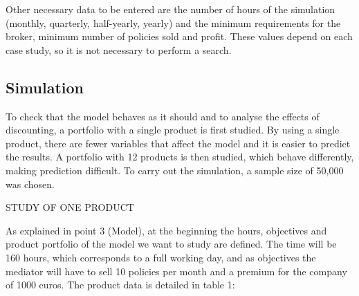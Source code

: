 \documentclass[review]{elsarticle}
\begin{document}
Other necessary data to be entered are the number of hours of the simulation (monthly, quarterly, half-yearly, yearly) and the minimum requirements for the broker, minimum number of policies sold and profit. These values depend on each case study, so it is not necessary to perform a search.


\subsection{Simulation}

To check that the model behaves as it should and to analyse the effects of discounting, a portfolio with a single product is first studied. By using a single product, there are fewer variables that affect the model and it is easier to predict the results.
A portfolio with 12 products is then studied, which behave differently, making prediction difficult.
To carry out the simulation, a sample size of 50,000 was chosen.


STUDY OF ONE PRODUCT

As explained in point 3 (Model), at the beginning the hours, objectives and product portfolio of the model we want to study are defined.
The time will be 160 hours, which corresponds to a full working day, and as objectives the mediator will have to sell 10 policies per month and a premium for the company of 1000 euros.
The product data is detailed in table 1:
\end{document}
